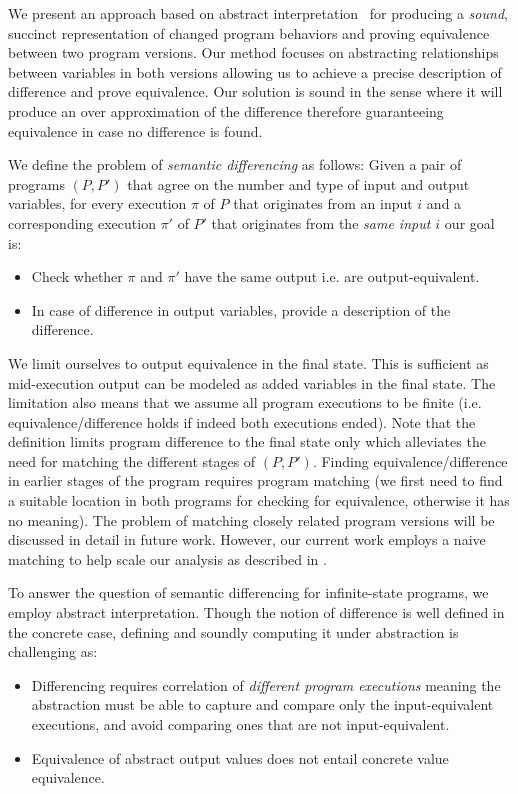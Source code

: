 We present an approach based on abstract interpretation~\cite{CousotCousot77} for producing a \emph{sound}, succinct representation of changed program behaviors and proving equivalence between two program versions. Our method focuses on abstracting relationships between variables in both versions allowing us to achieve a precise description of difference and prove equivalence. Our solution is sound in the sense where it will produce an over approximation of the difference therefore guaranteeing equivalence in case no difference is found.

We define the problem of \emph{semantic differencing} as follows: Given a pair of programs $(P,P')$ that agree on the number and type of input and output variables, for every execution $\pi$ of $P$ that originates from an input $i$ and a corresponding execution $\pi'$ of $P'$ that originates from the \emph{same input $i$} our goal is:
\begin{itemize}
\item Check whether $\pi$ and $\pi'$ have the same output i.e. are output-equivalent.
\item In case of difference in output variables, provide a description of the difference.
\end{itemize}
We limit ourselves to output equivalence in the final state. This is sufficient as mid-execution output can be modeled as added variables in the final state. The limitation also means that we assume all program executions to be finite (i.e. equivalence/difference holds if indeed both executions ended). Note that the definition limits program difference to the final state only which alleviates the need for matching the different stages of $(P,P')$. Finding equivalence/difference in earlier stages of the program requires program matching (we first need to find a suitable location in both programs for checking for equivalence, otherwise it has no meaning). The problem of matching closely related program versions will be discussed in detail in future work. However, our current work employs a naive matching to help scale our analysis as described in \secref{}.

To answer the question of semantic differencing for infinite-state programs, we employ abstract interpretation. Though the notion of difference is well defined in the concrete case, defining and soundly computing it under abstraction is challenging as:
\begin{itemize}
\item Differencing requires correlation of \emph{different program executions} meaning the abstraction must be able to capture and compare only the input-equivalent executions, and avoid comparing ones that are not input-equivalent.
\item Equivalence of abstract output values does not entail concrete value equivalence.
\end{itemize}


